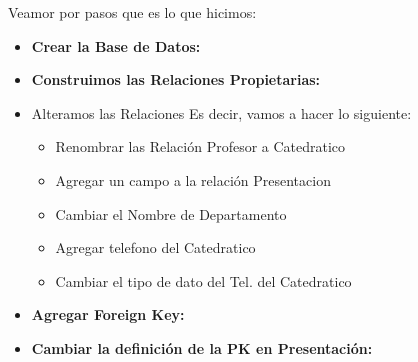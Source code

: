 \documentclass[12pt, fleqn]{article}                             %
\begin{document}
    Veamor por pasos que es lo que hicimos:

    \begin{itemize}

        \item
            \textbf{Crear la Base de Datos:}
            \lstset{basicstyle=\tiny}
            

        \item
            \textbf{Construimos las Relaciones Propietarias:}
            \lstset{basicstyle=\tiny}
            
            
        \clearpage
        \item{Alteramos las Relaciones}
            Es decir, vamos a hacer lo siguiente:
            
            \begin{itemize}
                \item Renombrar las Relación Profesor a Catedratico
                \item Agregar un campo a la relación Presentacion
                \item Cambiar el Nombre de Departamento
                \item Agregar telefono del Catedratico
                \item Cambiar el tipo de dato del Tel. del Catedratico
            \end{itemize}
            
            \lstset{basicstyle=\tiny}
            


        \item
            \textbf{Agregar Foreign Key:}
            \lstset{basicstyle=\tiny}
            
            
        \item
            \textbf{Cambiar la definición de la PK en Presentación:}
            \lstset{basicstyle=\tiny}
            

    \end{itemize}


    \clearpage
\end{document}
